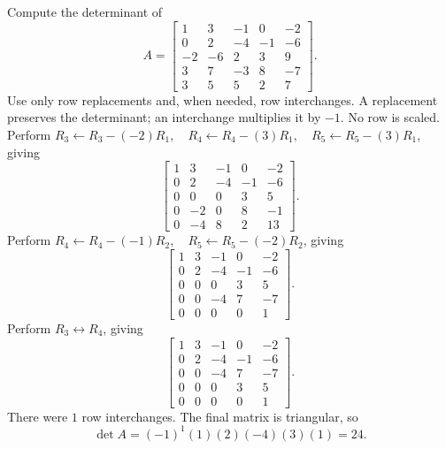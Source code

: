 \goal Compute the determinant of
\[A=\begin{bmatrix}1&3&-1&0&-2\\0&2&-4&-1&-6\\-2&-6&2&3&9\\3&7&-3&8&-7\\3&5&5&2&7\end{bmatrix}.\]
Use only row replacements and, when needed, row interchanges. A replacement preserves the determinant; an interchange multiplies it by $-1$. No row is scaled.
Perform $R_3\leftarrow R_3-(-2)R_1,\quad R_4\leftarrow R_4-(3)R_1,\quad R_5\leftarrow R_5-(3)R_1$, giving
\[
\begin{bmatrix}1&3&-1&0&-2\\0&2&-4&-1&-6\\0&0&0&3&5\\0&-2&0&8&-1\\0&-4&8&2&13\end{bmatrix}.
\]
Perform $R_4\leftarrow R_4-(-1)R_2,\quad R_5\leftarrow R_5-(-2)R_2$, giving
\[
\begin{bmatrix}1&3&-1&0&-2\\0&2&-4&-1&-6\\0&0&0&3&5\\0&0&-4&7&-7\\0&0&0&0&1\end{bmatrix}.
\]
Perform $R_3\leftrightarrow R_4$, giving
\[
\begin{bmatrix}1&3&-1&0&-2\\0&2&-4&-1&-6\\0&0&-4&7&-7\\0&0&0&3&5\\0&0&0&0&1\end{bmatrix}.
\]
There were $1$ row interchanges. The final matrix is triangular, so
\[\det A=(-1)^{1}(1)(2)(-4)(3)(1)=24.\]



